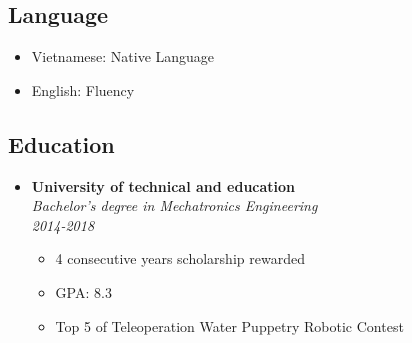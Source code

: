 \documentclass[10pt,oneside,a4paper]{article}
\begin{document}
\begin{tcolorbox}
\begin{minipage}[t]{8cm}
\begin{tcolorbox}[grow to left by=0.6cm, colback=gray!25,colframe=white]
            \section*{Language}
            \begin{itemize}
                \item {Vietnamese: Native Language}
                \item {English: Fluency}
            \end{itemize}
            \vspace*{10\baselineskip}
        \end{tcolorbox}
    \end{minipage}
    \begin{minipage}[t]{11cm}
        \vspace*{-0.5cm}
        \begin{tcolorbox}[grow to right by=0.75cm,colback=white,colframe=white]
            \section*{Education}
            \begin{itemize}
                \item 
                {
                    \textbf{University of technical and education} \\
                    \emph{Bachelor’s degree in Mechatronics Engineering} \\
                    \emph{2014-2018}
                    \begin{itemize}[label=$\circ$]
                        \item {4 consecutive years scholarship rewarded}
                        \item {GPA: 8.3}
                        \item {Top 5 of Teleoperation Water Puppetry Robotic Contest}
                    \end{itemize}
                }
            \end{itemize}


\end{tcolorbox}
\end{minipage}
\end{tcolorbox}
\end{document}
